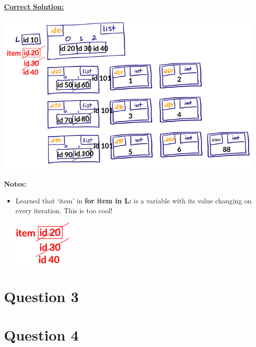 \documentclass[12pt]{article}
\begin{document}
\begin{mdframed}
    \underline{\textbf{Correct Solution:}}

    \bigskip

    \begin{center}
    \includegraphics[width=0.8 \linewidth]{images/worksheet_1_review_q2_correction.png}
    \end{center}

\end{mdframed}

\bigskip

\textbf{Notes:}

\begin{itemize}
    \item Learned that `item' in \textbf{for item in L:} is a variable with its
    value changing on every iteration. This is too cool!

    \begin{center}
    \includegraphics[width=0.2\linewidth]{images/worksheet_1_review_q2_note.png}
    \end{center}
\end{itemize}

\section*{Question 3}

\section*{Question 4}
\end{document}
